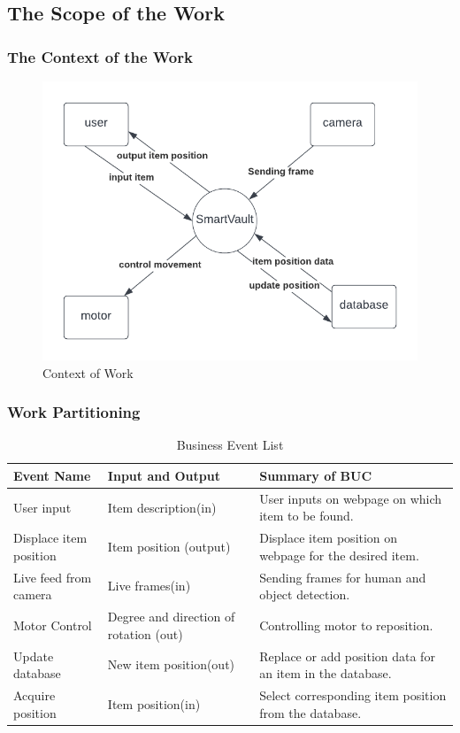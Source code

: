 \documentclass[12pt]{article}
\begin{document}
\subsection{The Scope of the Work}

\subsubsection{The Context of the Work}
\begin{figure}[H]
    \centering
    \includegraphics[scale=0.7]{work_context.png}
    \caption{Context of Work}
\end{figure}
\subsubsection{Work Partitioning}

\begin{table}[H]
\caption{Business Event List} 
\begin{tabularx}{\textwidth}{XXX}
\toprule
\textbf{Event Name} & \textbf{Input and Output} & \textbf{Summary of BUC}\\
\midrule
User input & Item description(in) & User inputs on webpage on which item to be found.\\
Displace item position & Item position (output) & Displace item position on webpage for the desired item.\\
Live feed from camera & Live frames(in) & Sending frames for human and object detection.\\
Motor Control& Degree and direction of rotation (out) & Controlling motor to reposition.\\
Update database & New item position(out) & Replace or add position data for an item in the database.\\
Acquire position & Item position(in) & Select corresponding item position from the database.\\

\bottomrule
\end{tabularx}
\end{table}
\end{document}
